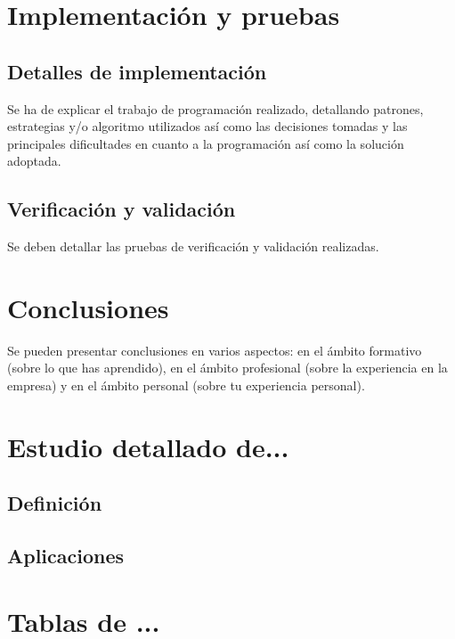 \documentclass[pdftex,11pt,a4paper]{book}
\begin{document}
\chapter{Implementación y pruebas}

\section{Detalles de implementación}

Se ha de explicar el trabajo de programación realizado, detallando patrones, estrategias y/o algoritmo utilizados así como las decisiones tomadas y las principales dificultades en cuanto a la programación así como la solución adoptada. 

\section{Verificación y validación}

Se deben detallar las pruebas de verificación y validación realizadas.

\chapter{Conclusiones}
Se pueden presentar conclusiones en varios aspectos: en el ámbito formativo (sobre lo que has aprendido), en el ámbito profesional (sobre la experiencia en la empresa) y en el ámbito personal (sobre tu experiencia personal).












\appendix
\renewcommand\appendixname{Anexo}



\chapter{Estudio detallado de...}

\section{Definición}

\section{Aplicaciones}



\chapter{Tablas de ...}
\end{document}
